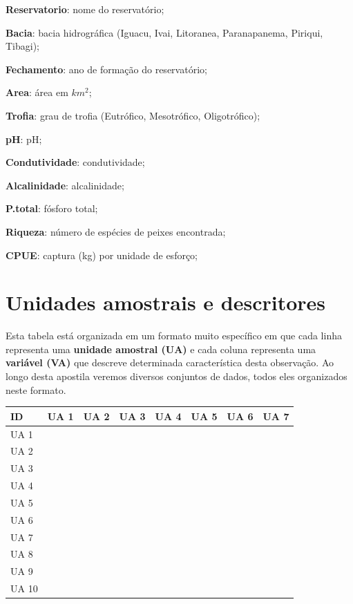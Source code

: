 \documentclass[
]{book}
\begin{document}
\textbf{Reservatorio}: nome do reservatório;

\textbf{Bacia}: bacia hidrográfica (Iguacu, Ivai, Litoranea, Paranapanema, Piriqui, Tibagi);

\textbf{Fechamento}: ano de formação do reservatório;

\textbf{Area}: área em \(km^2\);

\textbf{Trofia}: grau de trofia (Eutrófico, Mesotrófico, Oligotrófico);

\textbf{pH}: pH;

\textbf{Condutividade}: condutividade;

\textbf{Alcalinidade}: alcalinidade;

\textbf{P.total}: fósforo total;

\textbf{Riqueza}: número de espécies de peixes encontrada;

\textbf{CPUE}: captura (kg) por unidade de esforço;

\hypertarget{unidades-amostrais-e-descritores}{%
\section{Unidades amostrais e descritores}\label{unidades-amostrais-e-descritores}}

Esta tabela está organizada em um formato muito específico em que cada linha representa uma \textbf{unidade amostral (UA)} e cada coluna representa uma \textbf{variável (VA)} que descreve determinada característica desta observação. Ao longo desta apostila veremos diversos conjuntos de dados, todos eles organizados neste formato.

\begin{table}
\centering\begingroup\fontsize{11}{13}\selectfont

\begin{tabular}{llllllll}
\toprule
ID & UA 1 & UA 2 & UA 3 & UA 4 & UA 5 & UA 6 & UA 7\\
\midrule
UA 1 &  &  &  &  &  &  & \\
UA 2 &  &  &  &  &  &  & \\
UA 3 &  &  &  &  &  &  & \\
UA 4 &  &  &  &  &  &  & \\
UA 5 &  &  &  &  &  &  & \\
\addlinespace
UA 6 &  &  &  &  &  &  & \\
UA 7 &  &  &  &  &  &  & \\
UA 8 &  &  &  &  &  &  & \\
UA 9 &  &  &  &  &  &  & \\
UA 10 &  &  &  &  &  &  & \\
\bottomrule
\end{tabular}
\endgroup{}
\end{table}
\end{document}

